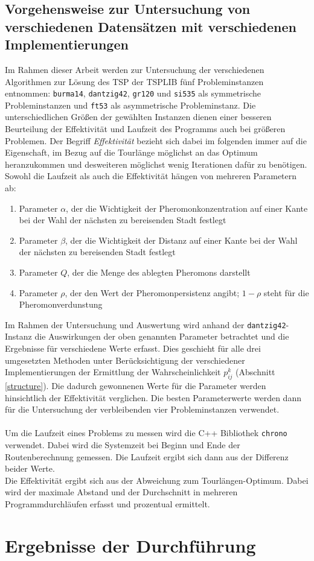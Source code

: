\documentclass[doktyp=barbeit, sprache=german]{TUBAFarbeiten}
\begin{document}
\subsection{Vorgehensweise zur Untersuchung von verschiedenen Datensätzen mit verschiedenen Implementierungen}
Im Rahmen dieser Arbeit werden zur Untersuchung der verschiedenen Algorithmen zur Lösung des TSP der TSPLIB fünf Probleminstanzen entnommen: \texttt{burma14}, \texttt{dantzig42}, \texttt{gr120} und \texttt{si535} als symmetrische Probleminstanzen und \texttt{ft53} als asymmetrische Probleminstanz.
Die unterschiedlichen Größen der gewählten Instanzen dienen einer besseren Beurteilung der Effektivität und Laufzeit des Programms auch bei größeren Problemen.
Der Begriff \textit{Effektivität} bezieht sich dabei im folgenden immer auf die Eigenschaft, im Bezug auf die Tourlänge möglichst an das Optimum heranzukommen und desweiteren möglichst wenig Iterationen dafür zu benötigen. Sowohl die Laufzeit als auch die Effektivität hängen von mehreren Parametern ab:
\begin{enumerate}
\item Parameter $\alpha$, der die Wichtigkeit der Pheromonkonzentration auf einer Kante bei der Wahl der nächsten zu bereisenden Stadt festlegt
\item Parameter $\beta$, der die Wichtigkeit der Distanz auf einer Kante bei der Wahl der nächsten zu bereisenden Stadt festlegt
\item Parameter $Q$, der die Menge des ablegten Pheromons darstellt
\item Parameter $\rho$, der den Wert der Pheromonpersistenz angibt; $1 - \rho$ steht für die Pheromonverdunstung
\end{enumerate}
Im Rahmen der Untersuchung und Auswertung wird anhand der \texttt{dantzig42}-Instanz die Auswirkungen der oben genannten Parameter betrachtet und die Ergebnisse für verschiedene Werte erfasst.
Dies geschieht für alle drei umgesetzten Methoden unter Berücksichtigung der verschiedener Implementierungen der Ermittlung der Wahrscheinlichkeit $p^k_{ij}$ (Abschnitt \ref{structure}).
Die dadurch gewonnenen Werte für die Parameter werden hinsichtlich der Effektivität verglichen. Die besten Parameterwerte werden dann für die Untersuchung der verbleibenden vier Probleminstanzen verwendet. 
\\\\Um die Laufzeit eines Problems zu messen wird die C++ Bibliothek \texttt{chrono} verwendet. Dabei wird die Systemzeit bei Beginn und Ende der Routenberechnung gemessen. Die Laufzeit ergibt sich dann aus der Differenz beider Werte. 
\\Die Effektivität ergibt sich aus der Abweichung zum Tourlängen-Optimum. Dabei wird der maximale Abstand und der Durchschnitt in mehreren Programmdurchläufen erfasst und prozentual ermittelt.
\newpage\section{Ergebnisse der Durchführung}
\end{document}
